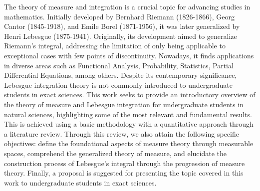 The theory of measure and integration is a crucial topic for advancing studies in mathematics. Initially developed by Bernhard Riemann (1826-1866), Georg Cantor (1845-1918), and Emile Borel (1871-1956), it was later generalized by Henri Lebesgue (1875-1941). Originally, its development aimed to generalize Riemann's integral, addressing the limitation of only being applicable to exceptional cases with few points of discontinuity. Nowadays, it finds applications in diverse areas such as Functional Analysis, Probability, Statistics, Partial Differential Equations, among others.
%
Despite its contemporary significance, Lebesgue integration theory is not commonly introduced to undergraduate students in exact sciences. This work seeks to provide an introductory overview of the theory of measure and Lebesgue integration for undergraduate students in natural sciences, highlighting some of the most relevant and fundamental results. This is achieved using a basic methodology with a quantitative approach through a literature review.
%
Through this review, we also attain the following specific objectives: define the foundational aspects of measure theory through measurable spaces, comprehend the generalized theory of measure, and elucidate the construction process of Lebesgue's integral through the progression of measure theory.
%
Finally, a proposal is suggested for presenting the topic covered in this work to undergraduate students in exact sciences.

